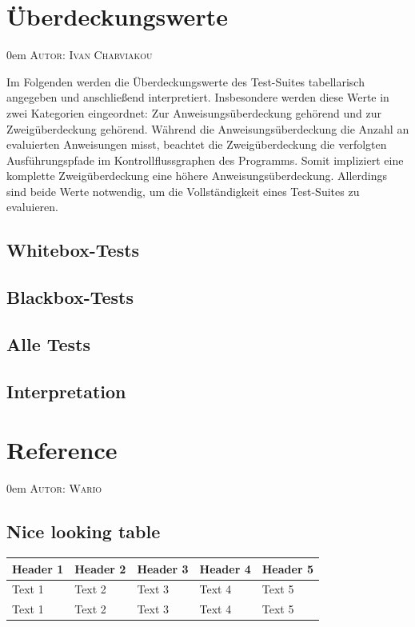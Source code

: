 \documentclass{article}
\makeatletter
\newcommand{\sectionauthor}[1]{
	{\parindent 0em \large \scshape Autor: #1 \par \nobreak \vspace*{1em}}
	\@afterheading
}
\makeatother
\begin{document}
\newpage

\section{Überdeckungswerte}
\sectionauthor{Ivan Charviakou}

Im Folgenden werden die Überdeckungswerte des Test-Suites tabellarisch angegeben und anschließend interpretiert.
Insbesondere werden diese Werte in zwei Kategorien eingeordnet: Zur Anweisungsüberdeckung gehörend und zur Zweigüberdeckung gehörend.
Während die Anweisungsüberdeckung die Anzahl an evaluierten Anweisungen misst, beachtet die Zweigüberdeckung die verfolgten Ausführungspfade im Kontrollflussgraphen des Programms.
Somit impliziert eine komplette Zweigüberdeckung eine höhere Anweisungsüberdeckung.
Allerdings sind beide Werte notwendig, um die Vollständigkeit eines Test-Suites zu evaluieren.

\subsection{Whitebox-Tests}

\subsection{Blackbox-Tests}

\subsection{Alle Tests}

\subsection{Interpretation}

\newpage

\section{Reference}
\sectionauthor{Wario}

\subsection{Nice looking table}
\begin{longtable}{@{}lllll@{}}
\toprule
\textbf{Header 1} & \textbf{Header 2} & \textbf{Header 3} & \textbf{Header 4} & \textbf{Header 5} \\* \midrule
\endfirsthead
%
\endhead
%
Text 1            & Text 2            & Text 3            & Text 4            & Text 5            \\
Text 1            & Text 2            & Text 3            & Text 4            & Text 5            \\* \bottomrule
\end{longtable}
\end{document}
